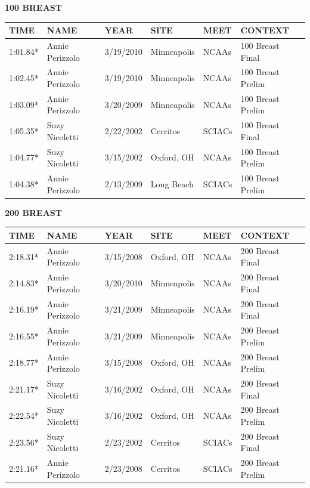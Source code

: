 \begin{table}[H]
\centering
\begin{minipage}[t]{0.48\textwidth}
\centering
\textbf{100 BREAST}\\[0.1cm]
\begin{tabular}{@{}p{1.8cm}p{2.8cm}p{1.2cm}p{1.4cm}p{1.4cm}p{2.0cm}@{}}
\hline
    \textbf{TIME} & \textbf{NAME} & \textbf{YEAR} & \textbf{SITE} & \textbf{MEET} & \textbf{CONTEXT} \\
\hline
    1:01.84* & Annie Perizzolo & 3/19/2010 & Minneapolis & NCAAs & 100 Breast Final \\
    1:02.45* & Annie Perizzolo & 3/19/2010 & Minneapolis & NCAAs & 100 Breast Prelim \\
    1:03.09* & Annie Perizzolo & 3/20/2009 & Minneapolis & NCAAs & 100 Breast Prelim \\
    1:05.35* & Suzy Nicoletti & 2/22/2002 & Cerritos & SCIACs & 100 Breast Final \\
    1:04.77* & Suzy Nicoletti & 3/15/2002 & Oxford, OH & NCAAs & 100 Breast Prelim \\
    1:04.38* & Annie Perizzolo & 2/13/2009 & Long Beach & SCIACs & 100 Breast Prelim \\
\hline
\end{tabular}
\end{minipage}\hfill
\begin{minipage}[t]{0.48\textwidth}
\centering
\textbf{200 BREAST}\\[0.1cm]
\begin{tabular}{@{}p{1.8cm}p{2.8cm}p{1.2cm}p{1.4cm}p{1.4cm}p{2.0cm}@{}}
\hline
    \textbf{TIME} & \textbf{NAME} & \textbf{YEAR} & \textbf{SITE} & \textbf{MEET} & \textbf{CONTEXT} \\
\hline
    2:18.31* & Annie Perizzolo & 3/15/2008 & Oxford, OH & NCAAs & 200 Breast Final \\
    2:14.83* & Annie Perizzolo & 3/20/2010 & Minneapolis & NCAAs & 200 Breast Final \\
    2:16.19* & Annie Perizzolo & 3/21/2009 & Minneapolis & NCAAs & 200 Breast Final \\
    2:16.55* & Annie Perizzolo & 3/21/2009 & Minneapolis & NCAAs & 200 Breast Prelim \\
    2:18.77* & Annie Perizzolo & 3/15/2008 & Oxford, OH & NCAAs & 200 Breast Prelim \\
    2:21.17* & Suzy Nicoletti & 3/16/2002 & Oxford, OH & NCAAs & 200 Breast Final \\
    2:22.54* & Suzy Nicoletti & 3/16/2002 & Oxford, OH & NCAAs & 200 Breast Prelim \\
    2:23.56* & Suzy Nicoletti & 2/23/2002 & Cerritos & SCIACs & 200 Breast Final \\
    2:21.16* & Annie Perizzolo & 2/23/2008 & Cerritos & SCIACs & 200 Breast Prelim \\
\hline
\end{tabular}
\end{minipage}
\end{table}

